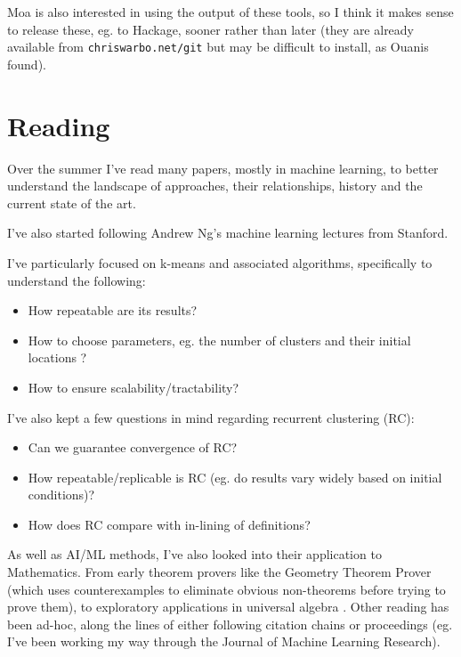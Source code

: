 \documentclass{article}
\begin{document}
Moa is also interested in using the output of these tools, so I think it makes sense to release these, eg. to Hackage, sooner rather than later (they are already available from \texttt{chriswarbo.net/git} but may be difficult to install, as Ouanis found).

\section{Reading}\label{reading}

Over the summer I've read many papers, mostly in machine learning, to
better understand the landscape of approaches, their relationships,
history and the current state of the art.

I've also started following Andrew Ng's machine learning lectures from
Stanford.

I've particularly focused on k-means and associated algorithms,
specifically to understand the following:

\begin{itemize}
\item
  How repeatable are its results? \cite{bottou1994convergence}
\item
  How to choose parameters, eg. the number of clusters
  \cite{pelleg2000x} and their initial locations \cite{arthur2007k}?
\item
  How to ensure scalability/tractability? \cite{bahmani2012scalable}
\end{itemize}

I've also kept a few questions in mind regarding recurrent clustering
(RC):

\begin{itemize}
\item
  Can we guarantee convergence of RC?
\item
  How repeatable/replicable is RC (eg. do results vary widely based on
  initial conditions)?
\item
  How does RC compare with in-lining of definitions?
\end{itemize}

As well as AI/ML methods, I've also looked into their application to
Mathematics. From early theorem provers like the Geometry Theorem Prover (which uses counterexamples to eliminate obvious non-theorems before trying to prove them), to exploratory
applications in universal algebra \cite{spector2008genetic}. Other
reading has been ad-hoc, along the lines of either following citation
chains or proceedings (eg. I've been working my way through the
Journal of Machine Learning Research).



\end{document}
